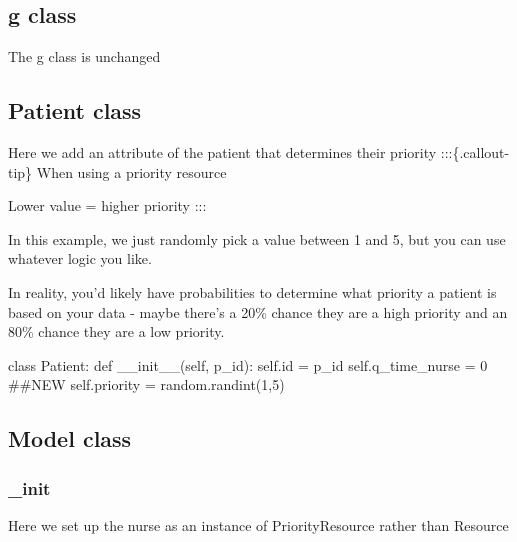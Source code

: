 \documentclass[
  letterpaper,
  DIV=11,
  numbers=noendperiod]{scrreprt}
\newenvironment{Shaded}{}{}
\newcommand{\BuiltInTok}[1]{\textcolor[rgb]{0.84,0.23,0.29}{#1}}
\newcommand{\CommentTok}[1]{\textcolor[rgb]{0.42,0.45,0.49}{#1}}
\newcommand{\DecValTok}[1]{\textcolor[rgb]{0.00,0.36,0.77}{#1}}
\newcommand{\FunctionTok}[1]{\textcolor[rgb]{0.44,0.26,0.76}{#1}}
\newcommand{\KeywordTok}[1]{\textcolor[rgb]{0.84,0.23,0.29}{#1}}
\newcommand{\NormalTok}[1]{\textcolor[rgb]{0.14,0.16,0.18}{#1}}
\newcommand{\OperatorTok}[1]{\textcolor[rgb]{0.14,0.16,0.18}{#1}}
\newcommand{\VariableTok}[1]{\textcolor[rgb]{0.89,0.38,0.04}{#1}}
\begin{document}
\subsection{g class}\label{g-class-2}

The g class is unchanged

\subsection{Patient class}\label{patient-class}

Here we add an attribute of the patient that determines their priority
:::\{.callout-tip\} When using a priority resource

Lower value = higher priority :::

In this example, we just randomly pick a value between 1 and 5, but you
can use whatever logic you like.

In reality, you'd likely have probabilities to determine what priority a
patient is based on your data - maybe there's a 20\% chance they are a
high priority and an 80\% chance they are a low priority.

\begin{Shaded}
\begin{Highlighting}[]
\KeywordTok{class}\NormalTok{ Patient:}
    \KeywordTok{def} \FunctionTok{\_\_init\_\_}\NormalTok{(}\VariableTok{self}\NormalTok{, p\_id):}
        \VariableTok{self}\NormalTok{.}\BuiltInTok{id} \OperatorTok{=}\NormalTok{ p\_id}
        \VariableTok{self}\NormalTok{.q\_time\_nurse }\OperatorTok{=} \DecValTok{0}
        \CommentTok{\#\#NEW}
        \VariableTok{self}\NormalTok{.priority }\OperatorTok{=}\NormalTok{ random.randint(}\DecValTok{1}\NormalTok{,}\DecValTok{5}\NormalTok{)}
\end{Highlighting}
\end{Shaded}

\subsection{Model class}\label{model-class-2}

\subsubsection{\_init}\label{init}

Here we set up the nurse as an instance of PriorityResource rather than
Resource
\end{document}
